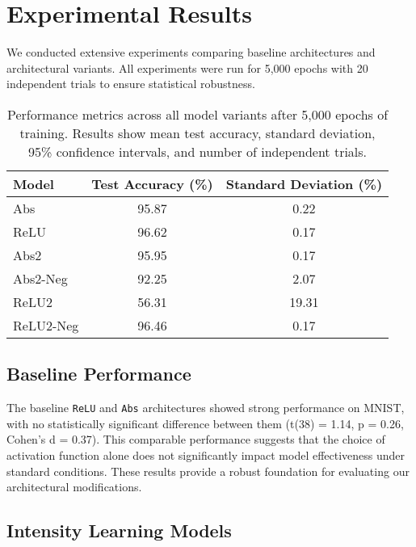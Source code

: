\section{Experimental Results}
\label{sec:results}

We conducted extensive experiments comparing baseline architectures and architectural variants. All experiments were run for 5,000 epochs with 20 independent trials to ensure statistical robustness.

\begin{table}[H]
    \centering
    \footnotesize
    \begin{tabular}{lcc}
        \toprule
        \textbf{Model} & \textbf{Test Accuracy (\%)} & \textbf{Standard Deviation (\%)}\\
        \midrule
        Abs & 95.87 & 0.22 \\
        ReLU & 96.62 & 0.17 \\
        \midrule
        Abs2 & 95.95 & 0.17 \\
        Abs2-Neg & 92.25 & 2.07 \\
        ReLU2 & 56.31 & 19.31 \\
        ReLU2-Neg & 96.46 & 0.17 \\
        \bottomrule
    \end{tabular}
    \caption{Performance metrics across all model variants after 5,000 epochs of training. Results show mean test accuracy, standard deviation, 95\% confidence intervals, and number of independent trials.}
    \label{tab:model_performance}
\end{table}

\subsection{Baseline Performance}
The baseline \texttt{ReLU} and \texttt{Abs} architectures showed strong performance on MNIST, with no statistically significant difference between them (t(38) = 1.14, p = 0.26, Cohen's d = 0.37). This comparable performance suggests that the choice of activation function alone does not significantly impact model effectiveness under standard conditions. These results provide a robust foundation for evaluating our architectural modifications.

\subsection{Intensity Learning Models}

